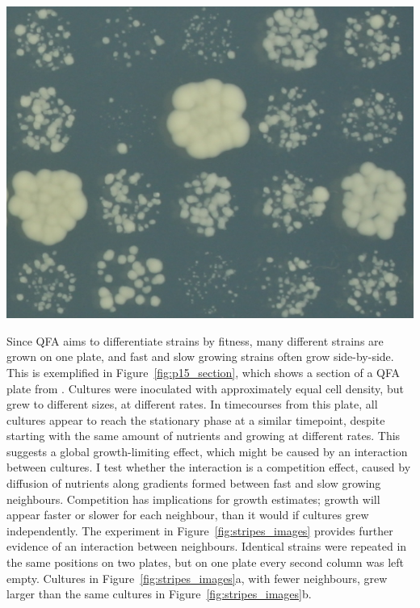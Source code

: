 \begin{Figure}
  \centering
  \includegraphics[width=\linewidth]{p15_section/p15_section_4x5_5_18}
  \label{fig:p15_section}
\end{Figure}
%
Since QFA aims to differentiate strains by fitness, many different
strains are grown on one plate, and fast and slow growing strains
often grow side-by-side. This is exemplified in
Figure~\ref{fig:p15_section}, which shows a section of a QFA plate
from \citet{Addinall2011}. Cultures were inoculated with approximately
equal cell density, but grew to different sizes, at different
rates. In timecourses from this plate, all cultures appear to reach
the stationary phase at a similar timepoint, despite starting with the
same amount of nutrients and growing at different rates. This suggests
a global growth-limiting effect, which might be caused by an
interaction between cultures. I test whether the interaction is a
competition effect, caused by diffusion of nutrients along gradients
formed between fast and slow growing neighbours. Competition has
implications for growth estimates; growth will appear faster or slower
for each neighbour, than it would if cultures grew independently. The
experiment in Figure~\ref{fig:stripes_images} provides further
evidence of an interaction between neighbours. Identical strains were
repeated in the same positions on two plates, but on one plate every
second column was left empty. Cultures in
Figure~\ref{fig:stripes_images}a, with fewer neighbours, grew larger
than the same cultures in Figure~\ref{fig:stripes_images}b.

